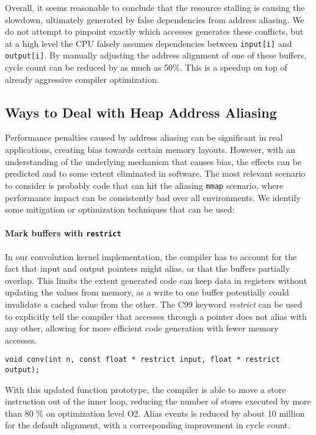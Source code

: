 \documentclass[prodmode,acmtaco]{acmsmall}
\begin{document}
Overall, it seems reasonable to conclude that the resource stalling is causing the slowdown, ultimately generated by false dependencies from address aliasing.
We do not attempt to pinpoint exactly which accesses generates these conflicts, but at a high level the CPU falsely assumes dependencies between \texttt{input[i]} and \texttt{output[i]}.
By manually adjusting the address alignment of one of these buffers, cycle count can be reduced by as much as 50\%.
This is a speedup on top of already aggressive compiler optimization.


\subsection{Ways to Deal with Heap Address Aliasing}
Performance penalties caused by address aliasing can be significant in real applications, creating bias towards certain memory layouts.
However, with an understanding of the underlying mechanism that causes bias, the effects can be predicted and to some extent eliminated in software.
The most relevant scenario to consider is probably code that can hit the aliasing \texttt{mmap} scenario, where performance impact can be consistently bad over all environments.
We identify some mitigation or optimization techniques that can be used:

\paragraph{Mark buffers with \texttt{restrict}}
In our convolution kernel implementation, the compiler has to account for the fact that input and output pointers might alias, or that the buffers partially overlap.
This limits the extent generated code can keep data in registers without updating the values from memory, as a write to one buffer potentially could invalidate a cached value from the other.
The C99 keyword \emph{restrict} can be used to explicitly tell the compiler that accesses through a pointer does not alias with any other, allowing for more efficient code generation with fewer memory accesses.
\begin{lstlisting}[breaklines=true]
    void conv(int n, const float * restrict input, float * restrict output);
\end{lstlisting}
With this updated function prototype, the compiler is able to move a store instruction out of the inner loop, reducing the number of stores executed by more than 80 \% on optimization level O2.
Alias events is reduced by about 10 million for the default alignment, with a corresponding improvement in cycle count. %
\end{document}
